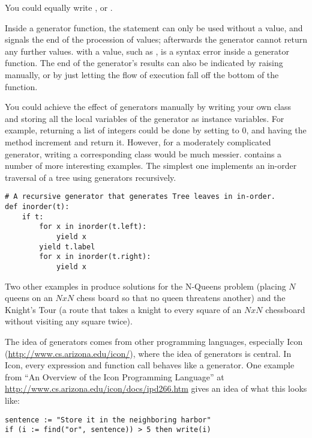 \documentclass{howto}
\begin{document}
You could equally write , or
.

Inside a generator function, the  statement can only
be used without a value, and signals the end of the procession of
values; afterwards the generator cannot return any further values.
 with a value, such as , is a syntax
error inside a generator function.  The end of the generator's results
can also be indicated by raising  manually,
or by just letting the flow of execution fall off the bottom of the
function.

You could achieve the effect of generators manually by writing your
own class and storing all the local variables of the generator as
instance variables.  For example, returning a list of integers could
be done by setting  to 0, and having the
 method increment  and return it.
However, for a moderately complicated generator, writing a
corresponding class would be much messier.
 contains a number of more
interesting examples.  The simplest one implements an in-order
traversal of a tree using generators recursively.

\begin{verbatim}
# A recursive generator that generates Tree leaves in in-order.
def inorder(t):
    if t:
        for x in inorder(t.left):
            yield x
        yield t.label
        for x in inorder(t.right):
            yield x
\end{verbatim}

Two other examples in  produce
solutions for the N-Queens problem (placing $N$ queens on an $NxN$
chess board so that no queen threatens another) and the Knight's Tour
(a route that takes a knight to every square of an $NxN$ chessboard
without visiting any square twice).

The idea of generators comes from other programming languages,
especially Icon (\url{http://www.cs.arizona.edu/icon/}), where the
idea of generators is central.  In Icon, every
expression and function call behaves like a generator.  One example
from ``An Overview of the Icon Programming Language'' at
\url{http://www.cs.arizona.edu/icon/docs/ipd266.htm} gives an idea of
what this looks like:

\begin{verbatim}
sentence := "Store it in the neighboring harbor"
if (i := find("or", sentence)) > 5 then write(i)
\end{verbatim}
\end{document}
